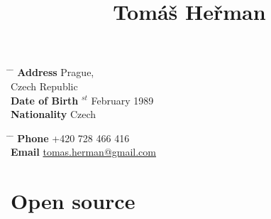 \documentclass[10pt]{article} %
\begin{document}

\title{Tomáš Heřman} %


\parbox{0.5\textwidth}{ %
\begin{tabbing} %
\hspace{3cm} \= \hspace{4cm} \= \kill %
{\bf Address} \>Prague,\\ %
\> Czech Republic \\ %
{\bf Date of Birth} $^{st}$ February 1989 \\ %
{\bf Nationality} \> Czech %
\end{tabbing}}
\hfill %
\parbox{0.5\textwidth}{ %
\begin{tabbing} %
\hspace{3cm} \= \hspace{4cm} \= \kill %
{\bf Phone} \> +420 728 466 416 \\ %
{\bf Email} \> \href{mailto:tomas.herman@gmail.com}{tomas.herman@gmail.com} \\ %
\end{tabbing}}


\section{Open source}


\end{document}

